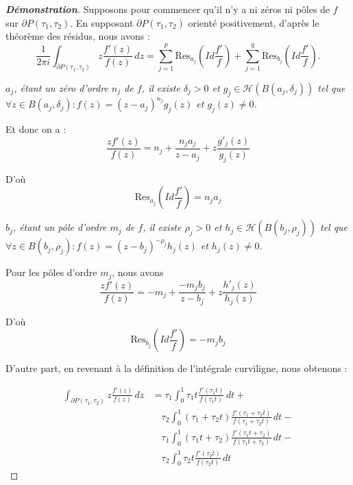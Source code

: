 \documentclass[12pt]{article}
\begin{document}
        \begin{proof}[\textbf{Démonstration}]
        Supposons pour commencer qu'il n'y a ni zéros ni pôles de \( f \) sur \( \partial P(\tau_1, \tau_2) \). En supposant \( \partial P(\tau_1, \tau_2) \) orienté positivement, d'après le théorème des résidus, nous avons :
        \[
        \frac{1}{2\pi i} \int_{\partial P(\tau_1, \tau_2)} z\frac{f'(z)}{f(z)} \, dz = \sum_{j=1}^p \text{Res}_{a_j} \left( Id\frac{f'}{f} \right) + \sum_{j=1}^q \text{Res}_{b_j} \left( Id\frac{f'}{f} \right).
        \]


        \textit{$a_j$, étant un zéro d'ordre $n_j$ de $f$, il existe $\delta_j > 0$ et $g_j \in \mathcal{H}(B(a_j, \delta_j))$ tel que $\forall z \in B(a_j, \delta_j): f(z) = (z - a_j)^{n_j} g_j(z)$ et $g_j(z) \neq 0$.}

        Et donc on a :
        \[
        \frac{z f'(z)}{f(z)} = n_j + \frac{n_j a_j}{z - a_j} + z \frac{g'_j(z)}{g_j(z)}
        \]

        D'où
        \[
        \text{Res}_{a_j} \left( Id\frac{f'}{f} \right) = n_j a_j
        \]

        \textit{$b_j$, étant un pôle d'ordre $m_j$ de $f$, il existe $\rho_j > 0$ et $h_j \in \mathcal{H}(B(b_j, \rho_j))$ tel que $\forall z \in B(b_j, \rho_j) : f(z) = (z - b_j)^{-\rho_j} h_j(z)$ et $h_j(z) \neq 0$.}

        Pour les pôles d'ordre $m_j$, nous avons
        \[
        \frac{z f'(z)}{f(z)} = -m_j + \frac{-m_j b_j}{z - b_j} + z\frac{h'_j(z)}{h_j(z)}
        \]

        D'où
        \[
        \text{Res}_{b_j} \left( Id\frac{f'}{f} \right) = -m_j b_j
        \]

        D'autre part, en revenant à la définition de l'intégrale curviligne, nous obtenons :

        \begin{align*}
            \int_{\partial P(\tau_1, \tau_2)} z \frac{f'(z)}{f(z)} \, dz &= \tau_1 \int_0^1 \tau_1 t \frac{f'(\tau_1 t)}{f(\tau_1 t)} \, dt + \\
            &\quad \tau_2 \int_0^1 (\tau_1 + \tau_2 t) \frac{f'(\tau_1 + \tau_2 t)}{f(\tau_1 + \tau_2 t)} \, dt - \\
            &\quad \tau_1 \int_0^1 (\tau_1 t + \tau_2) \frac{f'(\tau_1 t + \tau_2)}{f(\tau_1t + \tau_2)} \, dt - \\
            &\quad \tau_2 \int_0^1 \tau_2 t \frac{f'(\tau_2 t)}{f(\tau_2 t)} \, dt
        \end{align*}


\end{proof}
\end{document}
